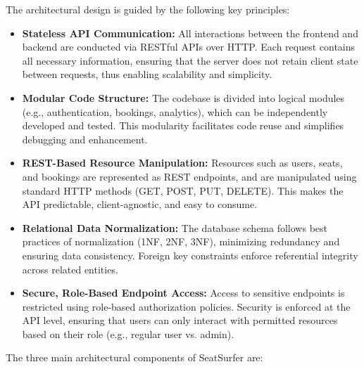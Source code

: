 \documentclass[12pt,a4paper]{report} %
\begin{document}
\noindent
The architectural design is guided by the following key principles:

\begin{itemize}
    \item \textbf{Stateless API Communication:} All interactions between the frontend and backend are conducted via RESTful APIs over HTTP. Each request contains all necessary information, ensuring that the server does not retain client state between requests, thus enabling scalability and simplicity.

    \item \textbf{Modular Code Structure:} The codebase is divided into logical modules (e.g., authentication, bookings, analytics), which can be independently developed and tested. This modularity facilitates code reuse and simplifies debugging and enhancement.

    \item \textbf{REST-Based Resource Manipulation:} Resources such as users, seats, and bookings are represented as REST endpoints, and are manipulated using standard HTTP methods (GET, POST, PUT, DELETE). This makes the API predictable, client-agnostic, and easy to consume.

    \item \textbf{Relational Data Normalization:} The database schema follows best practices of normalization (1NF, 2NF, 3NF), minimizing redundancy and ensuring data consistency. Foreign key constraints enforce referential integrity across related entities.

    \item \textbf{Secure, Role-Based Endpoint Access:} Access to sensitive endpoints is restricted using role-based authorization policies. Security is enforced at the API level, ensuring that users can only interact with permitted resources based on their role (e.g., regular user vs. admin).
\end{itemize}

\noindent
The three main architectural components of SeatSurfer are:
\end{document}
